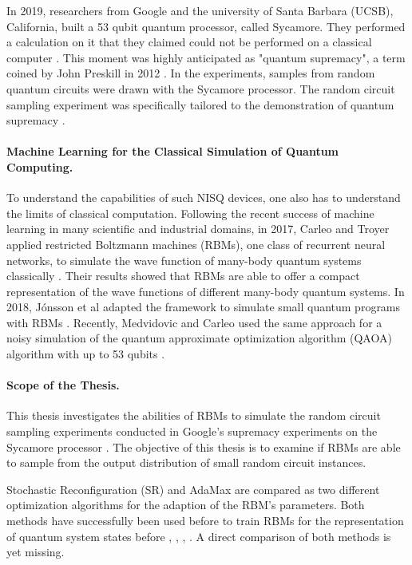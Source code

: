 In 2019, researchers from Google and the university of Santa Barbara (UCSB), California, built a 
53 qubit quantum processor, called Sycamore. They performed a calculation on it that they claimed could not be 
performed on a classical computer \cite{martines2019supremacy}. This moment was highly anticipated 
as "quantum supremacy", a term coined by John Preskill in 2012 \cite{preskill2012quantum}. In the experiments, 
samples from random quantum circuits were drawn with the Sycamore processor.
The random circuit sampling experiment was specifically tailored 
to the demonstration of quantum supremacy \cite{Boixo2018supremacy}.

\paragraph{Machine Learning for the Classical Simulation of Quantum Computing.}
To understand the capabilities of such NISQ devices, one also has to understand 
the limits of classical computation. Following the recent success of machine learning in 
many scientific and industrial domains, in 2017, Carleo and Troyer applied restricted Boltzmann machines (RBMs),
one class of recurrent neural networks,
to simulate the wave function of many-body quantum systems classically \cite{carleo2017solving}.
Their results showed that RBMs are able to offer a compact representation of the wave functions 
of different many-body quantum systems. In 2018, 
J\'{o}nsson et al adapted the framework to simulate small quantum programs with 
RBMs \cite{jnsson2018neuralnetwork}. Recently, Medvidovic and Carleo used the 
same approach for a noisy simulation of the quantum approximate optimization algorithm 
(QAOA) algorithm with up to 53 qubits \cite{medvidovic2020classical}.

\paragraph{Scope of the Thesis.}
This thesis investigates the abilities of RBMs to simulate the random circuit sampling 
experiments conducted in Google's supremacy experiments on the Sycamore processor \cite{martines2019supremacy}. 
The objective of this thesis is to examine if RBMs are able to sample from the output distribution 
of small random circuit instances.

Stochastic Reconfiguration (SR) \cite{sorella1998green} and 
AdaMax \cite{kingma2014adam} are compared as two different optimization algorithms for the 
adaption of the RBM's parameters. Both methods have successfully been used before to train RBMs 
for the representation of quantum system states before \cite{jnsson2018neuralnetwork}, \cite{carleo2017solving}, \cite{carleo2018constructing}, \cite{medvidovic2020classical}.
A direct comparison of both methods is yet missing. 


